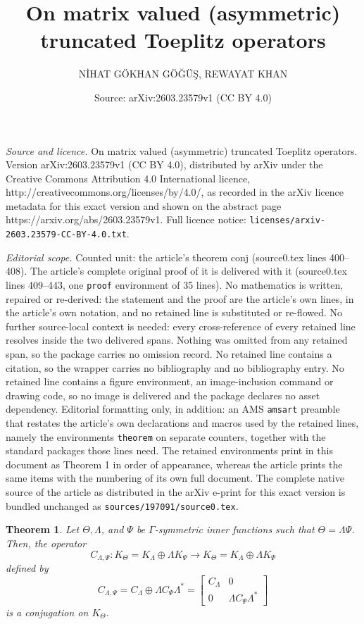 \documentclass[10pt,a4paper]{amsart}
\title{On matrix valued (asymmetric) truncated Toeplitz operators}
\author{NİHAT GÖKHAN GÖĞÜŞ, REWAYAT KHAN}
\date{Source: arXiv:2603.23579v1 (CC BY 4.0)}
\newtheorem{theorem}{Theorem}
\begin{document}
\maketitle

\noindent\emph{Source and licence.} On matrix valued (asymmetric) truncated Toeplitz operators. Version arXiv:2603.23579v1 (CC BY 4.0), distributed by arXiv under the Creative Commons Attribution 4.0 International licence, http://creativecommons.org/licenses/by/4.0/, as recorded in the arXiv licence metadata for this exact version and shown on the abstract page https://arxiv.org/abs/2603.23579v1. Full licence notice: \texttt{licenses/arxiv-2603.23579-CC-BY-4.0.txt}.\par\smallskip

\noindent\textit{Editorial scope.} Counted unit: the article's theorem conj (source0.tex lines 400--408). The article's complete original proof of it is delivered with it (source0.tex lines 409--443, one \texttt{proof} environment of 35 lines). No mathematics is written, repaired or re-derived: the statement and the proof are the article's own lines, in the article's own notation, and no retained line is substituted or re-flowed.  No further source-local context is needed: every cross-reference of every retained line resolves inside the two delivered spans.  Nothing was omitted from any retained span, so the package carries no omission record.  No retained line contains a citation, so the wrapper carries no bibliography and no bibliography entry.  No retained line contains a figure environment, an image-inclusion command or drawing code, so no image is delivered and the package declares no asset dependency.  Editorial formatting only, in addition: an AMS \texttt{amsart} preamble that restates the article's own declarations and macros used by the retained lines, namely the environments \texttt{theorem} on separate counters, together with the standard packages those lines need.  The retained environments print in this document as Theorem 1 in order of appearance, whereas the article prints the same items with the numbering of its own full document.  The complete native source of the article as distributed in the arXiv e-print for this exact version is bundled unchanged as \texttt{sources/197091/source0.tex}.
\begin{theorem}\label{conj}
Let $\Theta, \Lambda$, and $\Psi$ be $\Gamma$-symmetric inner functions such that $\Theta=\Lambda\Psi$. Then, the operator $$C_{\Lambda,\Psi}:K_{\Theta}=K_{\Lambda}\oplus\Lambda K_{\Psi}\to K_{\Theta}=K_{\Lambda}\oplus\Lambda K_{\Psi}$$ defined by
$$C_{\Lambda,\Psi}=C_{\Lambda}\oplus\Lambda C_{\Psi}\Lambda^{*}=\begin{bmatrix}
C_{\Lambda}&0\\
0&\Lambda C_{\Psi}\Lambda^{*}
\end{bmatrix}
$$
is a conjugation on $K_{\Theta}$.
\end{theorem}
\end{document}
